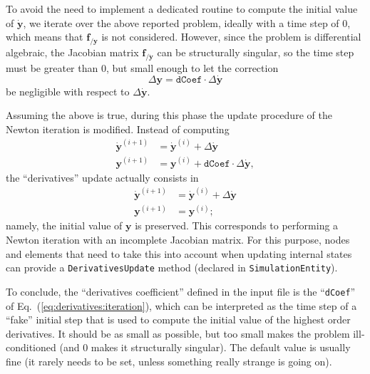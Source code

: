 \documentclass[10pt,dvips,fleqn,subeqn]{report}
\newcommand{\T}[1]{\bm{#1}}
\begin{document}
To avoid the need to implement a dedicated routine to compute 
the initial value of $\dot{\T{y}}$, we iterate over the above reported problem, 
ideally with a time step of $0$, which means that $\T{f}_{/\T{y}}$ is not considered.  
However, since the problem is differential algebraic, 
the Jacobian matrix $\T{f}_{/\dot{\T{y}}}$ can be structurally singular,
so the time step must be greater than $0$, but small enough to let the correction
\begin{equation}
	\Delta \T{y} = \texttt{dCoef} \cdot \Delta \dot{\T{y}}
	\label{eq:derivatives:dcoef}
\end{equation}
be negligible with respect to $\Delta \dot{\T{y}}$.  

Assuming the above is true, during this phase the update procedure
of the Newton iteration is modified.
Instead of computing
\begin{subequations}
\label{eq:derivatives:update}
\begin{align}
	\dot{\T{y}}^{(i+1)} &= \dot{\T{y}}^{(i)} + \Delta\dot{\T{y}}
	\\
	\T{y}^{(i+1)} &= \T{y}^{(i)} + \texttt{dCoef} \cdot \Delta\dot{\T{y}}
	,
\end{align}
\end{subequations}
the ``derivatives'' update actually consists in
\begin{subequations}
\label{eq:derivatives:modified-update}
\begin{align}
	\dot{\T{y}}^{(i+1)} &= \dot{\T{y}}^{(i)} + \Delta\dot{\T{y}}
	\\
	\T{y}^{(i+1)} &= \T{y}^{(i)}
	;
\end{align}
\end{subequations}
namely, the initial value of $\T{y}$ is preserved.
This corresponds to performing a Newton iteration
with an incomplete Jacobian matrix.
For this purpose, nodes and elements that need to take this into account
when updating internal states can provide a \texttt{DerivativesUpdate} method
(declared in \texttt{SimulationEntity}).

To conclude, the ``derivatives coefficient'' defined in the input file 
is the ``\texttt{dCoef}'' of Eq.~(\ref{eq:derivatives:iteration}), 
which can be interpreted as the time step of a ``fake'' 
initial step that is used to compute the initial value of 
the highest order derivatives.  
It should be as small as possible, but too small makes 
the problem ill-conditioned (and $0$ makes it structurally singular).  
The default value is usually fine 
(it rarely needs to be set, unless something 
really strange is going on).\\
\end{document}
